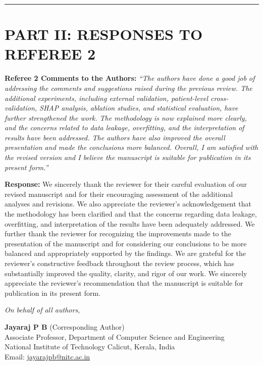 \documentclass[11pt,a4paper]{article}
\newcommand{\reviewer}[1]{{\color{reviewgray}\textit{#1}}}
\newenvironment{authorresponse}{\par\begingroup\color{authorblue}}{\endgroup\par}
\begin{document}
\vspace{2em}
\hrule
\vspace{1.5em}

\section*{PART II: RESPONSES TO REFEREE 2}

\noindent\textbf{Referee 2 Comments to the Authors:}
\reviewer{“The authors have done a good job of addressing the comments and suggestions raised during the previous review. The additional experiments, including external validation, patient-level cross-validation, SHAP analysis, ablation studies, and statistical evaluation, have further strengthened the work. The methodology is now explained more clearly, and the concerns related to data leakage, overfitting, and the interpretation of results have been addressed. The authors have also improved the overall presentation and made the conclusions more balanced. Overall, I am satisfied with the revised version and I believe the manuscript is suitable for publication in its present form.”}

\begin{authorresponse}
\textbf{Response:}
We sincerely thank the reviewer for their careful evaluation of our revised manuscript and for their encouraging assessment of the additional analyses and revisions. We also appreciate the reviewer’s acknowledgement that the methodology has been clarified and that the concerns regarding data leakage, overfitting, and interpretation of the results have been adequately addressed. We further thank the reviewer for recognizing the improvements made to the presentation of the manuscript and for considering our conclusions to be more balanced and appropriately supported by the findings. We are grateful for the reviewer’s constructive feedback throughout the review process, which has substantially improved the quality, clarity, and rigor of our work. We sincerely appreciate the reviewer’s recommendation that the manuscript is suitable for publication in its present form.
\end{authorresponse}

\vspace{2em}
\noindent\textit{On behalf of all authors,}

\bigskip
\noindent\textbf{Jayaraj P B} (Corresponding Author)\\
Associate Professor, Department of Computer Science and Engineering\\
National Institute of Technology Calicut, Kerala, India\\
Email: \href{mailto:jayarajpb@nitc.ac.in}{jayarajpb@nitc.ac.in}
\end{document}
